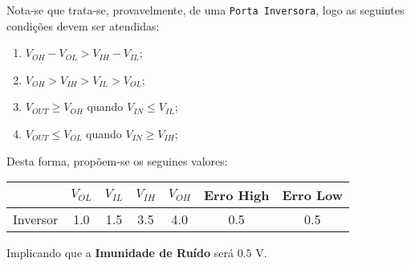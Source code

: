 \documentclass{article}
\begin{document}
            \begin{resolution}
                Nota-se que trata-se, provavelmente, de uma \texttt{Porta Inversora}, logo as seguintes condições devem ser atendidas:
                    \begin{enumerate}[noitemsep]
                        \item $V_{OH} - V_{OL} > V_{IH} - V_{IL}$;
                        \item $V_{OH} > V_{IH} > V_{IL} > V_{OL}$;
                        \item $V_{OUT} \ge V_{OH}$ quando $V_{IN} \le V_{IL}$;
                        \item $V_{OUT} \le V_{OL}$ quando $V_{IN} \ge V_{IH}$;
                    \end{enumerate}
                Desta forma, propõem-se os seguines valores:
                    \begin{table}[H]
                        \centering  
                        \begin{tabular}[]{l|cccc|cc}\hline
                                     & $V_{OL}$ & $V_{IL}$ & $V_{IH}$ & $V_{OH}$ & Erro High & Erro Low\\\hline
                            Inversor & 1.0      & 1.5      & 3.5      & 4.0      & 0.5       & 0.5\\\hline
                        \end{tabular}
                    \end{table}
                Implicando que a \textbf{Imunidade de Ruído} será $\boxed{0.5\text{ V}}$.
            \end{resolution}

\newpage
\end{document}
